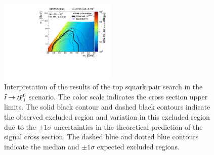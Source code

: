 \begin{figure}
\centering
\includegraphics[width=0.5\textwidth]{HCPPlots/stop_interpretation.pdf}
\caption{Interpretation of the results of the top squark pair search in the $\tilde{t}\to t\tilde{\chi}_{1}^{0}$ scenario. The color scale indicates the
cross section upper limits. The solid black contour and dashed black contours indicate the observed excluded region and variation in this
excluded region due to the $\pm1\sigma$ uncertainties in the theoretical prediction of the signal cross section. The dashed blue
and dotted blue contours indicate the median and $\pm1\sigma$ expected excluded regions. }
\label{fig:stop_interpretation}       %
\end{figure}
